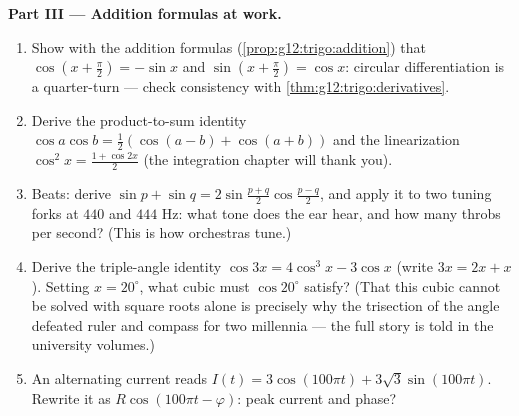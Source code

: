 \begin{problem}
\medskip
\noindent\textbf{Part III --- Addition formulas at work.}
\begin{enumerate}[resume]
  \item Show with the addition formulas
        (\cref{prop:g12:trigo:addition}) that
        $\cos\left(x + \frac\pi2\right) = -\sin x$ and
        $\sin\left(x + \frac\pi2\right) = \cos x$: circular
        differentiation is a quarter-turn --- check consistency
        with \cref{thm:g12:trigo:derivatives}.
  \item Derive the product-to-sum identity
        $\cos a \cos b = \frac12\left(\cos(a - b) +
        \cos(a + b)\right)$ and the linearization
        $\cos^2 x = \frac{1 + \cos 2x}{2}$ (the integration
        chapter will thank you).
  \item Beats: derive
        $\sin p + \sin q = 2 \sin\frac{p + q}{2}
        \cos\frac{p - q}{2}$, and apply it to two tuning forks
        at $440$ and $444$ Hz: what tone does the ear hear, and
        how many throbs per second? (This is how orchestras
        tune.)
  \item Derive the triple-angle identity
        $\cos 3x = 4\cos^3 x - 3\cos x$
        (write $3x = 2x + x$). Setting $x = 20^\circ$, what
        cubic  must $\cos 20^\circ$ satisfy? (That this
        cubic cannot be solved with square roots alone is
        precisely why the trisection of the angle defeated
        ruler and compass for two millennia --- the full story
        is told in the university volumes.)
  \item An alternating current reads
        $I(t) = 3\cos(100\pi t) + 3\sqrt3 \sin(100\pi t)$.
        Rewrite it as $R\cos(100\pi t - \varphi)$: peak
        current and phase?
\end{enumerate}


\end{problem}
